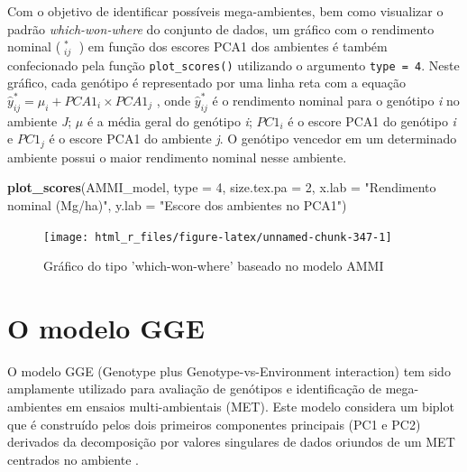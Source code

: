 \documentclass[
]{book}
\newenvironment{Shaded}{\begin{snugshade}}{\end{snugshade}}
\newcommand{\DataTypeTok}[1]{\textcolor[rgb]{0.13,0.29,0.53}{#1}}
\newcommand{\DecValTok}[1]{\textcolor[rgb]{0.00,0.00,0.81}{#1}}
\newcommand{\KeywordTok}[1]{\textcolor[rgb]{0.13,0.29,0.53}{\textbf{#1}}}
\newcommand{\NormalTok}[1]{#1}
\newcommand{\StringTok}[1]{\textcolor[rgb]{0.31,0.60,0.02}{#1}}
\begin{document}
Com o objetivo de identificar possíveis mega-ambientes, bem como visualizar o padrão \emph{which-won-where} do conjunto de dados, um gráfico com o rendimento nominal (\(\mathop {\hat y} \nolimits_ {ij}^*\) ) em função dos escores PCA1 dos ambientes é também confecionado pela função \texttt{plot\_scores()} utilizando o argumento \texttt{type\ =\ 4}. Neste gráfico, cada genótipo é representado por uma linha reta com a equação \(\hat y_{ij}^* = \mu_i + PCA1_i \times PCA1_j\) , onde \(\hat y_{ij}^*\) é o rendimento nominal para o genótipo \emph{i} no ambiente \emph{J}; \(\mu\) é a média geral do genótipo \emph{i}; \(PC{1_i}\) é o escore PCA1 do genótipo \emph{i} e \(PC{1_j}\) é o escore PCA1 do ambiente \emph{j}. O genótipo vencedor em um determinado ambiente possui o maior rendimento nominal nesse ambiente.

\begin{Shaded}
\begin{Highlighting}[]
\KeywordTok{plot_scores}\NormalTok{(AMMI_model,}
            \DataTypeTok{type =} \DecValTok{4}\NormalTok{,}
            \DataTypeTok{size.tex.pa =} \DecValTok{2}\NormalTok{,}
            \DataTypeTok{x.lab =} \StringTok{"Rendimento nominal (Mg/ha)"}\NormalTok{,}
            \DataTypeTok{y.lab =} \StringTok{"Escore dos ambientes no PCA1"}\NormalTok{)}
\end{Highlighting}
\end{Shaded}

\begin{figure}

{\centering \texttt{[image: html\_r\_files/figure-latex/unnamed-chunk-347-1]} 

}

\caption{Gráfico do tipo 'which-won-where' baseado no modelo AMMI}\label{fig:unnamed-chunk-347}
\end{figure}

\hypertarget{o-modelo-gge}{%
\section{O modelo GGE}\label{o-modelo-gge}}


O modelo GGE (Genotype plus Genotype-vs-Environment interaction) tem sido amplamente utilizado para avaliação de genótipos e identificação de mega-ambientes em ensaios multi-ambientais (MET). Este modelo considera um biplot que é construído pelos dois primeiros componentes principais (PC1 e PC2) derivados da decomposição por valores singulares de dados oriundos de um MET centrados no ambiente \citep{Yan2007}.
\end{document}
